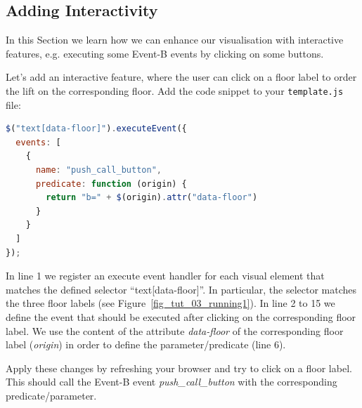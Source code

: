 \subsection{Adding Interactivity}

In this Section we learn how we can enhance our visualisation with interactive features, e.g. executing some Event-B events by clicking on some buttons.

Let's add an interactive feature, where the user can click on a floor label to order the lift on the corresponding floor.
Add the code snippet to your \texttt{template.js} file:
\newpage
\begin{lstlisting}[language=JavaScript, caption={Example of an Interactive Feature (JavaScript)}]
$("text[data-floor]").executeEvent({
  events: [
    {
      name: "push_call_button", 
      predicate: function (origin) {
        return "b=" + $(origin).attr("data-floor")
      }
    }
  ]
});
\end{lstlisting}
In line 1 we register an execute event handler for each visual element that matches the defined selector ``text[data-floor]''.
In particular, the selector matches the three floor labels (see Figure~\ref{fig_tut_03_running1}).
In line 2 to 15 we define the event that should be executed after clicking on the corresponding floor label.
We use the content of the attribute \textit{data-floor} of the corresponding floor label (\textit{origin}) in order to define the parameter/predicate (line 6).

Apply these changes by refreshing your browser and try to click on a floor label.
This should call the Event-B event \textit{push\_call\_button} with the corresponding predicate/parameter.

